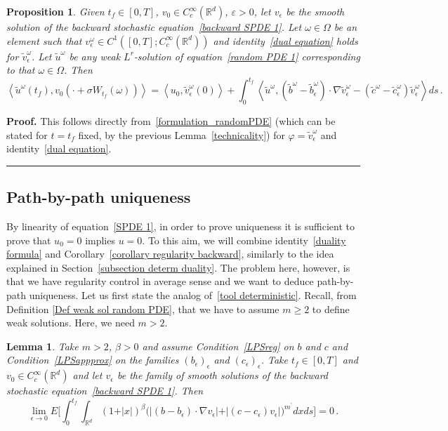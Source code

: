 \documentclass[a4paper,10pt]{article}
\newtheorem{lemma}[theorem]{Lemma}
\newtheorem{proposition}[theorem]{Proposition}
\newenvironment{proof}[1][Proof]{\noindent\textbf{#1.} }{\ \rule{0.5em}{0.5em}}
\newcommand{\eps}{\epsilon}
\begin{document}
\begin{proposition}
Given $t_{f}\in [0,T]$, $v_{0}\in C_{c}^{\infty}(\mathbb{R}^{d})$, $\varepsilon>0$, let $v_{\epsilon}$ be the smooth solution of the backward stochastic equation~\eqref{backward SPDE 1}. Let $\omega\in\Omega$ be an element such that $v_{\epsilon}^\omega\in C^{1}([0,T];C_{c}^{\infty}(\mathbb{R}^{d}))$ and identity~\eqref{dual equation} holds for $\widetilde{v}_{\epsilon}^\omega$. Let $\widetilde{u}^\omega$ be any weak $L^{r}$-solution of
equation~\eqref{random PDE 1} corresponding to that $\omega\in\Omega$. Then
\begin{equation}
\left\langle \widetilde{u}^\omega(t_{f})  ,v_{0}(\cdot+\sigma W_{t_{f}}(\omega))  \right\rangle
\label{duality formula} 
=\left\langle u_{0},\widetilde{v}_{\epsilon}^\omega(0)
\right\rangle +\int_{0}^{t_{f}}\left\langle \widetilde{u}^\omega,(\widetilde{b}^\omega  -\widetilde{b}_{\epsilon}^\omega)  \cdot\nabla\widetilde{v}_{\epsilon}^\omega  - (  \widetilde{c}^\omega -\widetilde{c}_{\epsilon}^\omega)  \widetilde{v}_{\epsilon}^\omega  \right\rangle ds \, .
\end{equation}
\end{proposition}

\begin{proof}
This follows directly from~\eqref{formulation_randomPDE} (which can be stated for $t=t_f$ fixed, by the previous Lemma~\ref{technicality}) for $\varphi = \widetilde{v}_{\epsilon}^\omega$ and identity~\eqref{dual equation}.
\end{proof}

\subsection{Path-by-path uniqueness\label{subsection path by path uniq}}

By linearity of equation~\eqref{SPDE 1}, in order to prove uniqueness it is
sufficient to prove that $u_{0}=0$ implies $u=0$. To this aim, we will combine identity~\eqref{duality formula} and Corollary~\ref{corollary regularity backward},
similarly to the idea explained in Section~\ref{subsection determ duality}.
The problem here, however, is that we have regularity control in average sense
and we want to deduce path-by-path uniqueness. Let us first state the analog
of~\eqref{tool deterministic}. Recall, from Definition
\ref{Def weak sol random PDE}, that we have to assume $m\geq2$
to define weak solutions. Here, we need $m>2$.

\begin{lemma}
\label{lemma tool stoch} Take $m>2$, $\beta>0$ and assume Condition~\ref{LPSreg} on $b$ and $c$ and Condition~\ref{LPSappprox} on the families $(b_\eps)_\eps$ and $(c_\eps)_\eps$. Take
$t_{f}\in [0,T]$ and $v_{0}\in C_{c}^{\infty}(\mathbb{R}^{d})$
and let $v_{\epsilon}$ be the family of smooth solutions of the backward stochastic equation~\eqref{backward SPDE 1}. Then
\[
\lim_{\epsilon\rightarrow0} E \bigg[ \int_{0}^{t_{f}}\int_{\mathbb{R}^{d}}(
1+\vert x \vert )^{\beta} \big( \vert (  b-b_{\epsilon})  \cdot\nabla v_{\epsilon} \vert + \vert (c-c_{\epsilon})  v_{\epsilon} \vert \big)^{m^{\prime}}dxds \bigg] =0 \,.
\]
\end{lemma}
\end{document}
